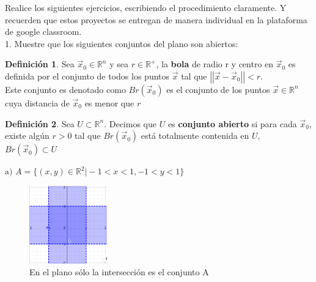 \documentclass[letterpaper]{article}
\providecommand{\norm}[1]{\left|\left|#1\right|\right|}
\newcommand{\R}{\mathds{R}}
\renewcommand{\*}{\cdot}
\theoremstyle{definition}
\newtheorem{definition}{Definición}
\begin{document}
\noindent Realice los siguientes ejercicios, escribiendo el procedimiento claramente. Y recuerden que estos proyectos se entregan de manera individual en la plataforma de google classroom. \\[0.5cm]
1.  Muestre que los siguientes conjuntos del plano son abiertos: 
\begin{definition}
	Sea $ \vec{x}_0  \in \R^n$  y sea $ r \in \R^+ $, la \textbf{bola} de radio r y centro en $ \vec{x}_0 $ es definida por el conjunto de todos los puntos $ \vec{x} $ tal que $ \norm{\vec{x} - \vec{x}_0} < r $.\\ Este conjunto es denotado como $ Br(\vec{x}_0) $ es el conjunto de los puntos $ \vec{x} \in \R^n $ cuya distancia de $ \vec{x}_0 $ es menor que $ r $
\end{definition}

\begin{definition}
	Sea $ U \subset \R^n $. Decimos que $ U $ es \textbf{conjunto abierto} si para cada $ \vec{x}_0 $, existe algún $ r>0 $ tal que $ Br(\vec{x}_0) $ está totalmente contenida en $ U $, $ Br(\vec{x}_0) \subset U $

\end{definition}

$\text{a) } A = \{ (x,y) \in \mathbb{R}^2 \vert - 1 < x < 1, - 1 < y < 1 \}$
\begin{figure}[h]
	\centering
	\includegraphics[width=0.3\textwidth]{1a}
	\caption{En el plano sólo la intersección es el conjunto A}
\end{figure}
\end{document}
